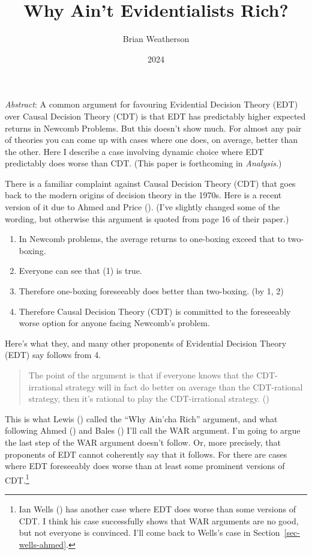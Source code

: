 \documentclass[
  11pt,
  letterpaper,
  DIV=11,
  numbers=noendperiod,
  twoside]{scrartcl}
\title{Why Ain't Evidentialists Rich?}
\author{Brian Weatherson}
\date{2024}
\providecommand{\tightlist}{%
  \setlength{\itemsep}{0pt}\setlength{\parskip}{0pt}}
\renewenvironment{abstract}
 {\vspace{-1.25cm}
 \quotation\small\noindent\emph{Abstract}:}
 {\endquotation}
\renewenvironment{abstract}
 {\quotation\small\noindent\emph{Abstract}:}
 {\endquotation\vspace{-0.02cm}}
\begin{document}
\maketitle
\begin{abstract}
A common argument for favouring Evidential Decision Theory (EDT) over
Causal Decision Theory (CDT) is that EDT has predictably higher expected
returns in Newcomb Problems. But this doesn't show much. For almost any
pair of theories you can come up with cases where one does, on average,
better than the other. Here I describe a case involving dynamic choice
where EDT predictably does worse than CDT. (This paper is forthcoming in
\emph{Analysis}.)
\end{abstract}


There is a familiar complaint against Causal Decision Theory (CDT) that
goes back to the modern origins of decision theory in the 1970s. Here is
a recent version of it due to Ahmed and Price
(). (I've slightly changed some of
the wording, but otherwise this argument is quoted from page 16 of their
paper.)

\begin{enumerate}
\def\labelenumi{\arabic{enumi}.}
\tightlist
\item
  In Newcomb problems, the average returns to one-boxing exceed that to
  two-boxing.
\item
  Everyone can see that (1) is true.
\item
  Therefore one-boxing foreseeably does better than two-boxing. (by 1,
  2)
\item
  Therefore Causal Decision Theory (CDT) is committed to the foreseeably
  worse option for anyone facing Newcomb's problem.
\end{enumerate}

Here's what they, and many other proponents of Evidential Decision
Theory (EDT) say follows from 4.

\begin{quote}
The point of the argument is that if everyone knows that the
CDT-irrational strategy will in fact do better on average than the
CDT-rational strategy, then it's rational to play the CDT-irrational
strategy. ()
\end{quote}

This is what Lewis () called the ``Why
Ain'cha Rich'' argument, and what following Ahmed
() and Bales
() I'll call the WAR argument. I'm going
to argue the last step of the WAR argument doesn't follow. Or, more
precisely, that proponents of EDT cannot coherently say that it follows.
For there are cases where EDT foreseeably does worse than at least some
prominent versions of CDT.\footnote{Ian Wells
  () has another case where EDT does worse
  than some versions of CDT. I think his case successfully shows that
  WAR arguments are no good, but not everyone is convinced. I'll come
  back to Wells's case in Section~\ref{sec-wells-ahmed}.}
\end{document}
